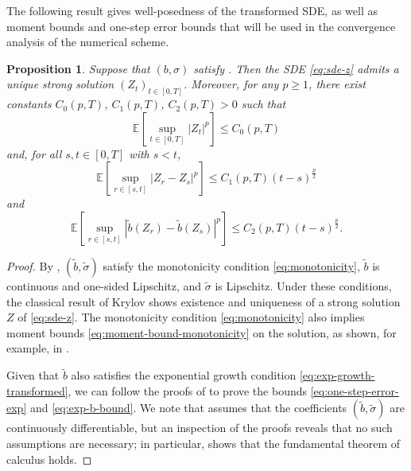 \documentclass[onseside, final]{amsart}
\newtheorem{proposition}[theorem]{Proposition}
\theoremstyle{definition}
\newcommand{\E}{\mathbb E}
\numberwithin{equation}{section}
\begin{document}
		The following result gives well-posedness of the transformed SDE, as well as moment bounds and one-step error bounds that will be used in the convergence analysis of the numerical scheme.
		
		\begin{proposition}\label{lem:transformed-existence-uniqueness}
			Suppose that $(b, \sigma)$ satisfy . Then the SDE \eqref{eq:sde-z} admits a unique strong solution $(Z_t)_{t \in [0, T]}$. Moreover, for any $p \geq 1$, there exist constants $C_0(p, T)$, $C_1(p, T)$, $C_2(p, T) > 0$ such that
			\begin{equation}\label{eq:moment-bound-monotonicity}
				\E \!\left[\sup_{t \in [0, T]}|Z_t|^p\right]\! \leq C_0(p, T)
			\end{equation}
			and, for all $s, t \in [0, T]$ with $s < t$,
			\begin{equation}\label{eq:one-step-error-exp}
				\E\!\left[\sup_{r \in [s, t]}|Z_r - Z_s|^p\right]\! \leq C_1(p, T)(t - s)^{\frac p2}
			\end{equation}
			and
			\begin{equation}\label{eq:exp-b-bound}
				\E\!\left[\sup_{r \in [s, t]}|\tilde b(Z_r) - \tilde b(Z_s)|^p\right]\! \leq C_2(p, T)(t - s)^{\frac p2}.
			\end{equation}
		\end{proposition}
				
		\begin{proof}
			By , $(\tilde b, \tilde \sigma)$ satisfy the monotonicity condition \eqref{eq:monotonicity}, $\tilde b$ is continuous and one-sided Lipschitz, and $\tilde \sigma$ is Lipschitz. Under these conditions, the classical result of Krylov \citep[Theorem 1]{Kr91} shows existence and uniqueness of a strong solution $Z$ of \eqref{eq:sde-z}.
			The monotonicity condition \eqref{eq:monotonicity} also implies moment bounds \eqref{eq:moment-bound-monotonicity} on the solution, as shown, for example, in \citep[Lemma 3.2]{HiMaSt02}.
			
			Given that $\tilde b$ also satisfies the exponential growth condition \eqref{eq:exp-growth-transformed}, we can follow the proofs of \citet[Lemma 3.4, Theorem 3.5]{Hu96} to prove the bounds \eqref{eq:one-step-error-exp} and \eqref{eq:exp-b-bound}. We note that \citet{Hu96} assumes that the coefficients $(\tilde b, \tilde \sigma)$ are continuously differentiable, but an inspection of the proofs reveals that no such assumptions are necessary; in particular,  shows that the fundamental theorem of calculus holds.
		\end{proof}
		
\end{document}
